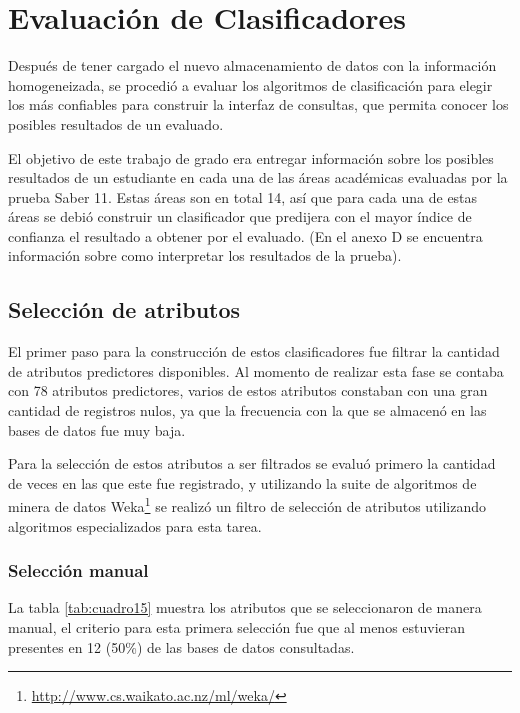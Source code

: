 \chapter{Evaluación de Clasificadores}
Después de tener cargado el nuevo almacenamiento de datos con la información homogeneizada, se procedió a evaluar los algoritmos de clasificación para elegir los más confiables para construir la interfaz de consultas, que permita conocer los posibles resultados de un evaluado.

El objetivo de este trabajo de grado era entregar información sobre los posibles resultados de un estudiante en cada una de las áreas académicas evaluadas por la prueba Saber 11\degree. Estas áreas son en total 14, así que para cada una de estas áreas se debió construir un clasificador que predijera con el mayor índice de confianza el resultado a obtener por el evaluado. (En el anexo D se encuentra información sobre como interpretar los resultados de la prueba).
\section{Selección de atributos}
El primer paso para la construcción de estos clasificadores fue filtrar la cantidad de atributos predictores disponibles. Al momento de realizar esta fase se contaba con 78 atributos predictores, varios de estos atributos constaban con una gran cantidad de registros nulos, ya que la frecuencia con la que se almacenó en las bases de datos fue muy baja.

Para la selección de estos atributos a ser filtrados se evaluó primero la cantidad de veces en las que este fue registrado, y utilizando la suite de algoritmos de minera de datos Weka\footnote{\url{http://www.cs.waikato.ac.nz/ml/weka/}} se realizó un filtro de selección de atributos utilizando algoritmos especializados para esta tarea.
\subsection{Selección manual}
La tabla \ref{tab:cuadro15} muestra los atributos que se seleccionaron de manera manual, el criterio para esta primera selección fue que al menos estuvieran presentes en 12 (50\%) de las bases de datos consultadas.

